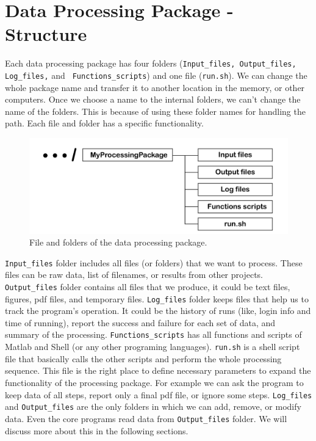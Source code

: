 \section{Data Processing Package - Structure}

Each data processing package has four folders (\texttt{Input\_files, Output\_files, \texttt{Log\_files,}} and \texttt{ Functions\_scripts}) and one file (\texttt{run.sh}). We can change the whole package name and transfer it to another location in the memory, or other computers. Once we choose a name to the internal folders, we can't change the name of the folders. This is because of using these folder names for handling the path. Each file and folder has a specific functionality.

\begin{figure} [ht]
\centering
\includegraphics[scale=0.8]{figures/pdf/Figure02.pdf} 
\caption{File and folders of the data processing package.}
\label{fig:structure}
\end{figure}

\noindent
\texttt{Input\_files} folder includes all files (or folders) that we want to process. These files can be raw data, list of filenames, or results from other projects. \texttt{Output\_files} folder contains all files that we produce, it could be text files, figures, pdf files, and temporary files. \texttt{Log\_files} folder keeps files that help us to track the program's operation. It could be the history of runs (like, login info and time of running), report the success and failure for each set of data, and summary of the processing.  \texttt{Functions\_scripts} has all functions and scripts of Matlab and Shell (or any other programing languages).  \texttt{run.sh} is a shell script file that basically calls the other scripts and perform the whole processing sequence. This file is the right place to define necessary parameters to expand the functionality of the processing package. For example we can ask the program to keep data of all steps, report only a final pdf file, or ignore some steps.  \texttt{Log\_files} and  \texttt{Output\_files} are the only folders in which we can add, remove, or modify data. Even the core programs read data from  \texttt{Output\_files} folder. We will discuss more about this in the following sections.


